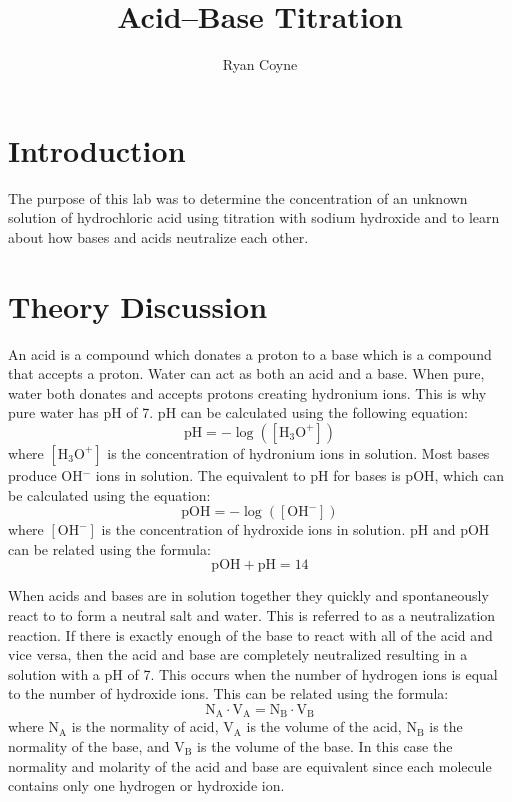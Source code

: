 \documentclass[12pt]{article}
\begin{document}
    \title{Acid--Base Titration}
    \author{Ryan Coyne}
    \maketitle
    \section*{Introduction}
        The purpose of this lab was to determine the concentration of an unknown solution of hydrochloric acid using titration with sodium hydroxide and to learn about how bases and acids neutralize each other. 
    \section*{Theory Discussion}
        An acid is a compound which donates a proton to a base which is a compound that accepts a proton. Water can act as both an acid and a base. When pure, water both donates and accepts protons creating hydronium ions. This is why pure water has pH of 7. pH can be calculated using the following equation:
        \begin{equation*}
            \text{pH} = -\log([\mathrm{H_3O^+}])
        \end{equation*}
        where \([\mathrm{H_3O^+}]\) is the concentration of hydronium ions in solution. Most bases produce OH\(^-\) ions in solution. The equivalent to pH for bases is pOH, which can be calculated using the equation:
        \begin{equation*}
            \text{pOH} = -\log(\mathrm{[OH^-]})
        \end{equation*}
        where \(\mathrm{[OH^-]}\) is the concentration of hydroxide ions in solution. pH and pOH can be related using the formula:
        \begin{equation*}
            \text{pOH} + \text{pH} = 14
        \end{equation*}
        
        When acids and bases are in solution together they quickly and spontaneously react to to form a neutral salt and water. This is referred to as a neutralization reaction. If there is exactly enough of the base to react with all of the acid and vice versa, then the acid and base are completely neutralized resulting in a solution with a pH of 7. This occurs when the number of hydrogen ions is equal to the number of hydroxide ions. This can be related using the formula:
        \begin{equation*}
            \mathrm{N_A \cdot V_A = N_B \cdot V_B}
        \end{equation*}
        where \(\mathrm{N_A}\) is the normality of acid, \(\mathrm{V_A}\) is the volume of the acid, \(\mathrm{N_B}\) is the normality of the base, and \(\mathrm{V_B}\) is the volume of the base. In this case the normality and molarity of the acid and base are equivalent since each molecule contains only one hydrogen or hydroxide ion.
\end{document}
